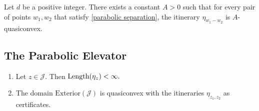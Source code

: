 \begin{corollary}
	Let $d$ be a positive integer. There exists a constant $A>0$ such that for every pair of points $w_1,w_2$ that satisfy \cref{parabolic separation}, the itinerary $\eta_{w_1-w_2}$ is $A$-quasiconvex.
\end{corollary}

\subsection{The Parabolic Elevator}

\begin{theorem} \label{quasiconvex-cauliflower} \leavevmode
	
	\begin{enumerate}[label=\normalfont(\roman*)]
		\item Let $z \in \mathcal J$. Then 
		$	\operatorname{Length}(\eta_z)<\infty.$
		
		\item The domain $\mathrm{Exterior}(\mathcal{J})$ is quasiconvex with the itineraries $\eta_{z_1,z_2}$ as certificates.
	\end{enumerate}
\end{theorem}

